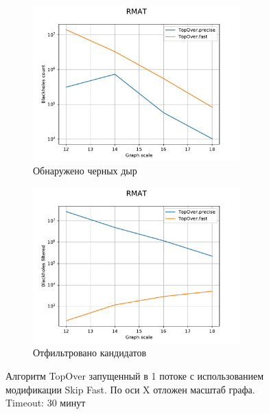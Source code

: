 \documentclass[12pt,a4paper,oneside,openany]{article}
\theoremstyle{definition}
\theoremstyle{lemma}
\theoremstyle{remark}
\begin{document}
\begin{figure}[H]
    \begin{subfigure}{.5\textwidth}
      \centering
      \includegraphics[width=8cm]{images/7_count_RMAT.pdf}
      \caption{Обнаружено черных дыр}
      \label{fig:fastskiprmat:count}
    \end{subfigure}
    \begin{subfigure}{.5\textwidth}
      \centering
      \includegraphics[width=8cm,height=6cm]{images/7_filtered_RMAT.pdf}
      \caption{Отфильтровано кандидатов}
      \label{fig:fastskiprmat:filtered}
    \end{subfigure}
    \caption{Алгоритм TopOver запущенный в 1 потоке с использованием модификации Skip Fast. По оси X отложен масштаб графа. Timeout: 30 минут}
    \label{fig:fastskiprmat}
\end{figure}
\end{document}
